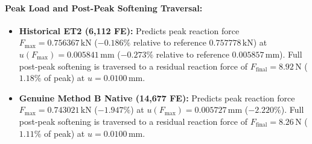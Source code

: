 \paragraph{Peak Load and Post-Peak Softening Traversal:}
\begin{itemize}
  \item \textbf{Historical ET2 (6,112 FE):} Predicts peak reaction force $F_{\max} = 0.756367\,\mathrm{kN}$ ($-0.186\%$ relative to reference $0.757778\,\mathrm{kN}$) at $u(F_{\max}) = 0.005841\,\mathrm{mm}$ ($-0.273\%$ relative to reference $0.005857\,\mathrm{mm}$). Full post-peak softening is traversed to a residual reaction force of $F_{\mathrm{final}} = 8.92\,\mathrm{N}$ ($1.18\%$ of peak) at $u = 0.0100\,\mathrm{mm}$.
  \item \textbf{Genuine Method B Native (14,677 FE):} Predicts peak reaction force $F_{\max} = 0.743021\,\mathrm{kN}$ ($-1.947\%$) at $u(F_{\max}) = 0.005727\,\mathrm{mm}$ ($-2.220\%$). Full post-peak softening is traversed to a residual reaction force of $F_{\mathrm{final}} = 8.26\,\mathrm{N}$ ($1.11\%$ of peak) at $u = 0.0100\,\mathrm{mm}$.
\end{itemize}

